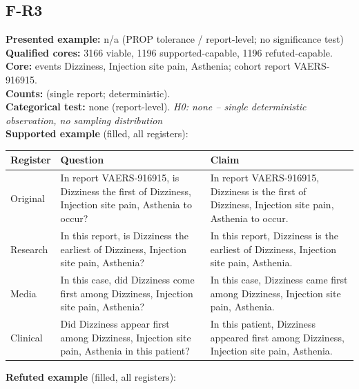 \documentclass[11pt]{article}
\begin{document}
\subsection*{F-R3}
\textbf{Presented example:} n/a (PROP tolerance / report-level; no significance test) \\
\textbf{Qualified cores:} 3166 viable, 1196 supported-capable, 1196 refuted-capable. \\
\textbf{Core:} events Dizziness, Injection site pain, Asthenia; cohort report VAERS-916915. \\
\textbf{Counts:} (single report; deterministic). \\
\textbf{Categorical test:} none (report-level). \emph{H0: none -- single deterministic observation, no sampling distribution} \\
\textbf{Supported example} (filled, all registers): \\
\begin{tabularx}{\linewidth}{@{}l L L@{}}
\toprule
\textbf{Register} & \textbf{Question} & \textbf{Claim} \\
\midrule
Original & In report VAERS-916915, is Dizziness the first of Dizziness, Injection site pain, Asthenia to occur? & In report VAERS-916915, Dizziness is the first of Dizziness, Injection site pain, Asthenia to occur. \\
Research & In this report, is Dizziness the earliest of Dizziness, Injection site pain, Asthenia? & In this report, Dizziness is the earliest of Dizziness, Injection site pain, Asthenia. \\
Media & In this case, did Dizziness come first among Dizziness, Injection site pain, Asthenia? & In this case, Dizziness came first among Dizziness, Injection site pain, Asthenia. \\
Clinical & Did Dizziness appear first among Dizziness, Injection site pain, Asthenia in this patient? & In this patient, Dizziness appeared first among Dizziness, Injection site pain, Asthenia. \\
\bottomrule
\end{tabularx}
\vspace{3pt}
\textbf{Refuted example} (filled, all registers): \\
\end{document}
